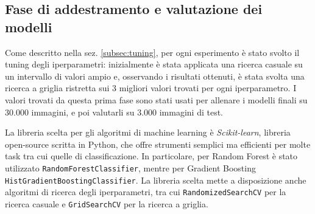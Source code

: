 \subsection{Fase di addestramento e valutazione dei modelli}\label{subsec:training}
Come descritto nella sez. \ref{subsec:tuning}, per ogni esperimento è stato svolto il tuning degli iperparametri: inizialmente è stata applicata una ricerca casuale su un intervallo di valori ampio e, osservando i risultati ottenuti, è stata svolta una ricerca a griglia ristretta sui 3 migliori valori trovati per ogni iperparametro. I valori trovati da questa prima fase sono stati usati per allenare i modelli finali su $30.000$ immagini, e poi valutarli su $3.000$ immagini di test.

La libreria scelta per gli algoritmi di machine learning è \textit{Scikit-learn}, libreria open-source scritta in Python, che offre strumenti semplici ma efficienti per molte task tra cui quelle di classificazione.
In particolare, per Random Forest è stato utilizzato \texttt{RandomForestClassifier}, mentre per Gradient Boosting \texttt{HistGradientBoostingClassifier}. La libreria scelta mette a disposizione anche algoritmi di ricerca degli iperparametri, tra cui \texttt{RandomizedSearchCV} per la ricerca casuale e \texttt{GridSearchCV} per la ricerca a griglia.
